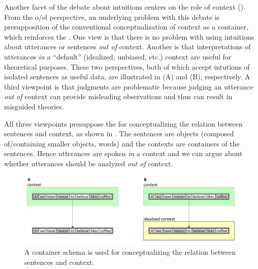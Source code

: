 Another facet of the debate about  intuitions centers on the role of context (\citealt{Bolinger1965,Keller2000,Schütze2016}). From the o/el perspective, an underlying problem with this debate is presupposition of the conventional conceptualization of context as a container, which reinforces the . One view is that there is no problem with using intuitions about utterances or sentences \textit{out of} context. Another is that interpretations of utterances \textit{in} a “default” (idealized, unbiased, etc.) context are useful for theoretical purposes. These two perspectives, both of which accept  intutions of isolated sentences as useful data, are illustrated in {}(A) and (B), respectively. A third viewpoint is that  judgments are problematic because judging an utterance \textit{out of} context can provide misleading observations and thus can result in misguided theories.

  All three viewpoints presuppose the  for conceptualizing the relation between sentences and context, as shown in {}. The sentences are objects (composed of/containing smaller objects, words) and the contexts are containers of the sentences. Hence utterances are spoken \textit{in} a context and we can argue about whether utterances should be analyzed \textit{out of} context.   

  
\begin{figure}
\includegraphics[width=\textwidth]{figures/Tilsen-img120.png}
\caption{A container schema is used for conceptualizing the relation between sentences and context.}
\label{fig:6:1}
\end{figure}
 

